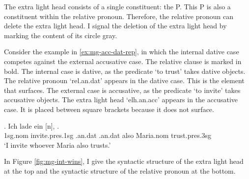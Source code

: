 The extra light head consists of a single constituent: the P.
This P is also a constituent within the relative pronoun. Therefore, the relative pronoun can delete the extra light head. I signal the deletion of the extra light head by marking the content of its circle gray.

Consider the example in \ref{ex:mg-acc-dat-rep}, in which the internal dative case competes against the external accusative case. The relative clause is marked in bold.
The internal case is dative, as the predicate  `to trust' takes dative objects. The relative pronoun  `\ac{rel}.\ac{an}.\ac{dat}' appears in the dative case. This is the element that surfaces.
The external case is accusative, as the predicate  `to invite' takes accusative objects. The extra light head  `\ac{elh}.\ac{an}.\ac{acc}' appears in the accusative case. It is placed between square brackets because it does not surface.

\exg. Ich {lade ein} [n],    .\\
1\ac{sg}.\ac{nom} invite.\ac{pres}.1\ac{sg}\scsub{[acc]} .\ac{an}.\ac{dat} .\ac{an}.\ac{dat} also Maria.\ac{nom} trust.\ac{pres}.3\ac{sg}\scsub{[dat]}\\
`I invite whoever Maria also trusts.' \label{ex:mg-acc-dat-rep}

In Figure \ref{fig:mg-int-wins}, I give the syntactic structure of the extra light head at the top and the syntactic structure of the relative pronoun at the bottom.

